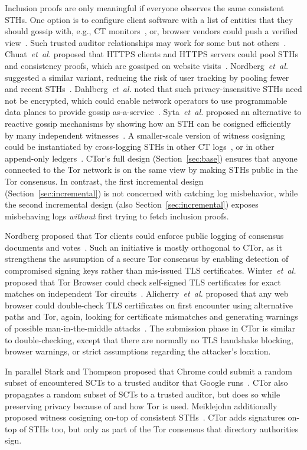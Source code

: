 Inclusion proofs are only meaningful if everyone observes the same consistent
STHs. One option is to configure client software with a list of entities that
they should gossip with, e.g., CT monitors~\cite{chase}, or, browser vendors
could push a verified view~\cite{sth-push}. Such trusted auditor relationships
may work for some but not others~\cite{nordberg}. Chuat~\emph{et~al.} proposed
that HTTPS clients and HTTPS servers could pool STHs and consistency proofs,
which are gossiped on website visits~\cite{chuat}. Nordberg~\emph{et~al.}
suggested a similar variant, reducing the risk of user tracking by pooling fewer
and recent STHs~\cite{nordberg}. Dahlberg~\emph{et~al.} noted that such
privacy-insensitive STHs need not be encrypted, which could enable network
operators to use programmable data planes to provide gossip
as-a-service~\cite{dahlberg}. Syta~\emph{et~al.} proposed an alternative to
reactive gossip mechanisms by showing how an STH can be cosigned efficiently by
many independent witnesses~\cite{syta}. A smaller-scale version of witness
cosigning could be instantiated by cross-logging STHs in other CT
logs~\cite{minimal-gossip}, or in other append-only ledgers~\cite{catena}.
CTor's full design (Section~\ref{sec:base}) ensures that anyone connected to the
Tor network is on the same view by making STHs public in the Tor consensus.  In
contrast, the first incremental design (Section~\ref{sec:incremental}) is not
concerned with catching log misbehavior, while the second incremental design
(also Section~\ref{sec:incremental}) exposes misbehaving logs \emph{without}
first trying to fetch inclusion proofs.

Nordberg proposed that Tor clients could enforce public logging of consensus
documents and votes~\cite{consensus-transparency}.  Such an initiative is mostly
orthogonal to CTor, as it strengthens the assumption of a secure Tor consensus
by enabling detection of compromised signing keys rather than mis-issued TLS
certificates.  Winter~\emph{et~al.} proposed that Tor Browser could check
self-signed TLS certificates for exact matches on independent Tor
circuits~\cite{spoiled-onions}.  Alicherry~\emph{et~al.} proposed that any web
browser could double-check TLS certificates on first encounter using alternative
paths and Tor, again, looking for certificate mismatches and generating warnings
of possible man-in-the-middle attacks~\cite{doublecheck}.  The submission phase
in CTor is similar to double-checking, except that there are normally no TLS
handshake blocking, browser warnings, or strict assumptions regarding the
attacker's location.

In parallel Stark and Thompson proposed that Chrome could submit a random subset
of encountered SCTs to a trusted auditor that Google runs~\cite{stark}.  CTor
also propagates a random subset of SCTs to a trusted auditor, but does so while
preserving privacy because of and how Tor is used.  Meiklejohn additionally
proposed witness cosigning on-top of consistent STHs~\cite{meiklejohn}.  CTor
adds signatures on-top of STHs too, but only as part of the Tor consensus that
directory authorities sign.
